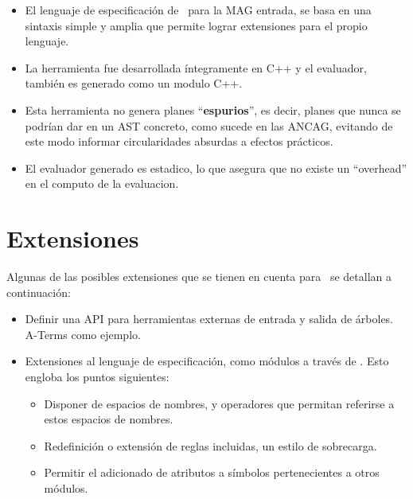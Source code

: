 \begin{itemize}
 \item El lenguaje de especificación de \maggen\ para la MAG entrada, se basa en una sintaxis simple y amplia que permite lograr extensiones para el propio lenguaje. 
 \item La herramienta fue desarrollada íntegramente en C++ y el evaluador, también es generado como un modulo C++. 
 \item Esta herramienta no genera planes ``\textbf{espurios}'', es decir, planes que nunca se podrían dar en un AST concreto, como sucede en las ANCAG, evitando de este modo informar circularidades absurdas a efectos prácticos.
 \item El evaluador generado es estadico, lo que asegura que no existe un ``overhead'' en el computo de la evaluacion.
\end{itemize}


\section{Extensiones}
Algunas de las posibles extensiones que se tienen en cuenta para \maggen\ se detallan a continuación:
\begin{itemize}
\item Definir una API para herramientas externas de entrada y salida de árboles. A-Terms como ejemplo.
\item Extensiones al lenguaje de especificación, como módulos a través de . Esto engloba los puntos siguientes:
\begin{itemize}
\item Disponer de espacios de nombres, y operadores que permitan referirse a estos espacios de nombres.
\item Redefinición o extensión de reglas incluidas, un estilo de sobrecarga.
\item Permitir el adicionado de atributos a símbolos pertenecientes a otros módulos.
\end{itemize}

\end{itemize}

